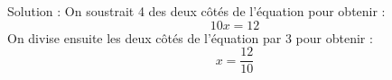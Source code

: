 \documentclass{article}
\begin{document}
Solution :
On soustrait 4 des deux côtés de l'équation pour obtenir :
\[10x = 12\]
On divise ensuite les deux côtés de l'équation par 3 pour obtenir :
\[x = \frac{12}{10}\]
\end{document}
